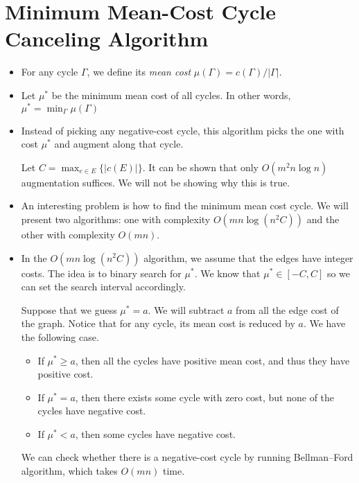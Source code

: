 \documentclass[10pt]{article}
\begin{document}
  \section{Minimum Mean-Cost Cycle Canceling Algorithm} %
  \label{sec:minimum_mean_cost_cycle_canceling_algorithm}
    \begin{itemize}
      \item For any cycle $\Gamma$, we define its \emph{mean cost}
        $\mu(\Gamma) = c(\Gamma) / |\Gamma|.$
        
      \item Let $\mu^*$ be the minimum mean cost of all cycles.
        In other words, $\mu^* = \min_{\Gamma} \mu(\Gamma)$
        
      \item Instead of picking any negative-cost cycle,
        this algorithm picks the one with cost $\mu^*$ and augment
        along that cycle.
        
      Let $C = \max_{e \in E} \{ |c(E)| \}$. It can be shown
        that only $O(m^2 n\log n)$ augmentation suffices. We will
        not be showing why this is true.
        
      \item An interesting problem is how to find the minimum mean cost cycle.
        We will present two algorithms: one with complexity $O(mn \log (n^2C))$
        and the other with complexity $O(mn).$
        
      \item In the $O(mn \log(n^2C))$ algorithm, we assume that the edges
        have integer costs. The idea is to binary search for $\mu^*$.
        We know that $\mu^* \in [-C, C]$ so we can set the search interval
        accordingly.
        
        Suppose that we guess $\mu^* = a.$ We will subtract $a$ from
        all the edge cost of the graph. Notice that for any cycle,
        its mean cost is reduced by $a.$ We have the following case.
        \begin{itemize}
          \item If $\mu^* \geq a$, then all the cycles have positive mean
            cost, and thus they have positive cost.
          \item If $\mu^* = a$, then there exists some cycle with
            zero cost, but none of the cycles have negative cost.
          \item If $\mu^* < a$, then some cycles have negative cost.
        \end{itemize}
        We can check whether there is a negative-cost cycle by running
        Bellman--Ford algorithm, which takes $O(mn)$ time.
        

\end{itemize}
\end{document}
